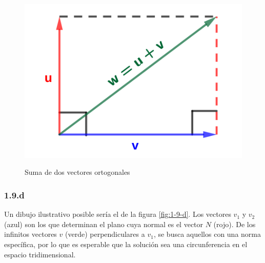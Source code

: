 \documentclass{article}
\begin{document}
\begin{figure}[ht]
\caption{Suma de dos vectores ortogonales}
\includegraphics[scale=1]{img/ejercicios/1/9-c.png} 
\centering
\label{fig:1-9-c}
\end{figure}

\subsubsection*{1.9.d}
\label{subsubsec:1.9.d}

Un dibujo ilustrativo posible sería el de la figura \ref{fig:1-9-d}. Los vectores $v_1$ y $v_2$ (azul) son los que determinan el plano cuya normal es el vector $N$ (rojo). De los infinitos vectores $v$ (verde) perpendiculares a $v_1$, se busca aquellos con una norma específica, por lo que es esperable que la solución sea una circunferencia en el espacio tridimensional. 
\end{document}
